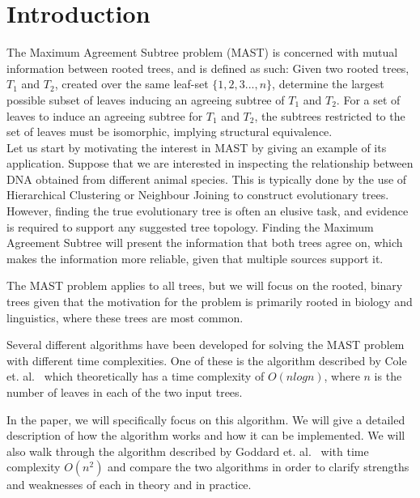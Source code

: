 \chapter{Introduction}
\setcounter{secnumdepth}{2}
\label{ch:intro}
The Maximum Agreement Subtree problem (MAST) is concerned with mutual information between rooted trees, and is defined as such: Given two rooted trees, $T_1$ and $T_2$, created over the same leaf-set $\{1,2,3...,n\}$, determine the largest possible subset of leaves inducing an agreeing subtree of $T_1$ and $T_2$. For a set of leaves to induce an agreeing subtree for $T_1$ and $T_2$, the subtrees restricted to the set of leaves must be isomorphic, implying structural equivalence.
\\

Let us start by motivating the interest in MAST by giving an example of its application. Suppose that we are interested in inspecting the relationship between DNA obtained from different animal species. This is typically done by the use of  Hierarchical Clustering or Neighbour Joining to construct evolutionary trees. However, finding the true evolutionary tree is often an elusive task, and evidence is required to support any suggested tree topology. Finding the Maximum Agreement Subtree will present the information that both trees agree on, which makes the information more reliable, given that multiple sources support it. 

The MAST problem applies to all trees, but we will focus on the rooted, binary trees given that the motivation for the problem is primarily rooted in biology and linguistics, where these trees are most common.

Several different algorithms have been developed for solving the MAST problem with different time complexities. One of these is the algorithm described by Cole et. al.\ \cite{nlogn} which theoretically has a time complexity of $O(nlogn)$, where $n$ is the number of leaves in each of the two input trees.

In the paper, we will specifically focus on this algorithm. We will give a detailed description of how the algorithm works and how it can be implemented. We will also walk through the algorithm described by Goddard et. al.\ \cite{nsquared} with time complexity $O(n^2)$ and compare the two algorithms in order to clarify strengths and weaknesses of each in theory and in practice.

